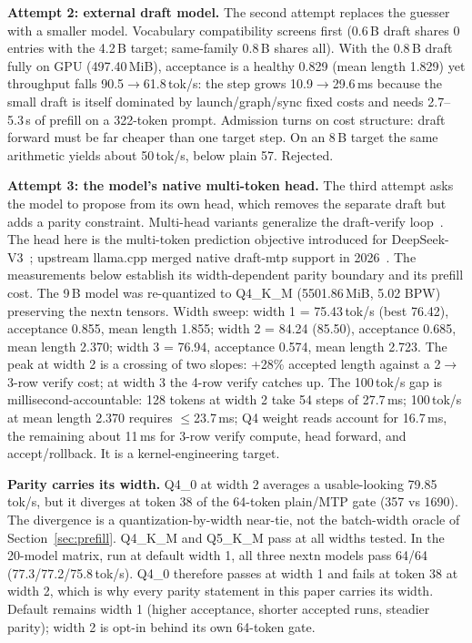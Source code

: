 \documentclass[letterpaper,twocolumn,10pt]{article}
\begin{document}
\textbf{Attempt 2: external draft model.} The second attempt replaces the
guesser with a smaller model. Vocabulary compatibility screens
first (0.6\,B draft shares 0 entries with the 4.2\,B target; same-family
0.8\,B shares all). With the 0.8\,B draft fully on GPU (497.40\,MiB),
acceptance is a healthy 0.829 (mean length 1.829) yet throughput falls
90.5$\rightarrow$61.8\,tok/s: the step grows 10.9$\rightarrow$29.6\,ms because
the small draft is itself dominated by launch/graph/sync fixed costs and needs
2.7--5.3\,s of prefill on a 322-token prompt. Admission turns on cost
structure: draft forward must be far cheaper than one target step. On an 8\,B
target the same arithmetic yields about 50\,tok/s, below plain 57. Rejected.

\textbf{Attempt 3: the model's native multi-token head.} The third attempt
asks the model to propose from its own head, which removes the separate draft
but adds a parity constraint. Multi-head variants
generalize the draft-verify loop~\cite{medusa2024}. The head here is the
multi-token prediction objective introduced for
DeepSeek-V3~\cite{deepseekv3}; upstream llama.cpp merged native draft-mtp
support in 2026~\cite{llamacppmtp}. The measurements below establish its
width-dependent parity boundary and its prefill cost. The 9\,B model was
re-quantized to Q4\_K\_M (5501.86\,MiB, 5.02 BPW) preserving the nextn tensors.
Width sweep: width 1 = 75.43\,tok/s (best 76.42), acceptance 0.855, mean
length 1.855; width 2 = 84.24 (85.50), acceptance 0.685, mean length 2.370;
width 3 = 76.94, acceptance 0.574, mean length 2.723. The peak at width 2 is a
crossing of two slopes: +28\% accepted length against a 2$\rightarrow$3-row
verify cost; at width 3 the 4-row verify catches up. The 100\,tok/s gap is
millisecond-accountable: 128 tokens at width 2 take 54 steps of 27.7\,ms;
100\,tok/s at mean length 2.370 requires $\le$23.7\,ms; Q4 weight reads account
for 16.7\,ms, the remaining about 11\,ms for 3-row verify compute, head
forward, and accept/rollback. It is a kernel-engineering target.

\textbf{Parity carries its width.} Q4\_0 at width 2 averages a usable-looking
79.85\,tok/s, but it diverges at token 38 of the 64-token plain/MTP gate (357
vs 1690). The divergence is a quantization-by-width near-tie, not the
batch-width oracle of Section~\ref{sec:prefill}. Q4\_K\_M and Q5\_K\_M pass at
all widths tested. In the 20-model matrix, run at
default width 1, all three nextn models pass 64/64 (77.3/77.2/75.8\,tok/s).
Q4\_0 therefore passes at width 1 and fails at token 38 at width 2, which is
why every parity statement in this paper carries its width. Default remains
width 1 (higher
acceptance, shorter accepted runs, steadier parity); width 2 is opt-in behind
its own 64-token gate.
\end{document}
